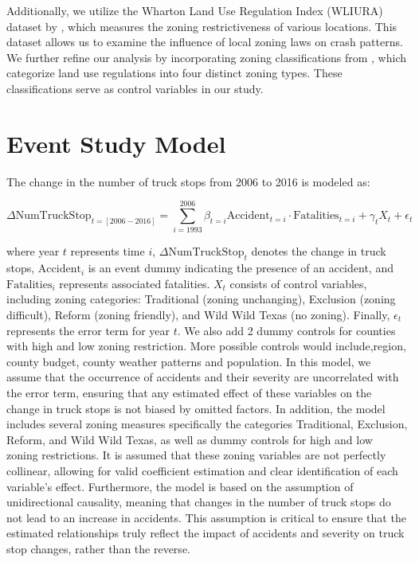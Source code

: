 \documentclass[
  8pt,
  12pt]{article}
\begin{document}
Additionally, we utilize the Wharton Land Use Regulation Index (WLIURA)
dataset by \citet{gyourkoNewMeasureLocal2008}, which measures the zoning
restrictiveness of various locations. This dataset allows us to examine
the influence of local zoning laws on crash patterns. We further refine
our analysis by incorporating zoning classifications from
\citet{puentesTraditionalReformedReview2006}, which categorize land use
regulations into four distinct zoning types. These classifications serve
as control variables in our study.

\section{Event Study Model}\label{event-study-model}

The change in the number of truck stops from 2006 to 2016 is modeled as:

\[
\Delta \text{NumTruckStop}_{t=[2006-2016]} = 
\sum_{i=1993}^{2006} \beta_{t=i} \text{Accident}_{t=i}\cdot \text{Fatalities}_{t=i} + \gamma_{t} X_{t} + \epsilon_{t}
\]

where year \(t\) represents time \(i\),
\(\Delta\text{NumTruckStop}_{t}\) denotes the change in truck stops,
\(\text{Accident}_{i}\) is an event dummy indicating the presence of an
accident, and \(\text{Fatalities}_{i}\) represents associated
fatalities. \(X_{t}\) consists of control variables, including zoning
categories: Traditional (zoning unchanging), Exclusion (zoning
difficult), Reform (zoning friendly), and Wild Wild Texas (no zoning).
Finally, \(\epsilon_{t}\) represents the error term for year \(t\). We
also add 2 dummy controls for counties with high and low zoning
restriction. More possible controls would include,region, county budget,
county weather patterns and population. In this model, we assume that
the occurrence of accidents and their severity are uncorrelated with the
error term, ensuring that any estimated effect of these variables on the
change in truck stops is not biased by omitted factors. In addition, the
model includes several zoning measures specifically the categories
Traditional, Exclusion, Reform, and Wild Wild Texas, as well as dummy
controls for high and low zoning restrictions. It is assumed that these
zoning variables are not perfectly collinear, allowing for valid
coefficient estimation and clear identification of each variable's
effect. Furthermore, the model is based on the assumption of
unidirectional causality, meaning that changes in the number of truck
stops do not lead to an increase in accidents. This assumption is
critical to ensure that the estimated relationships truly reflect the
impact of accidents and severity on truck stop changes, rather than the
reverse.
\end{document}

